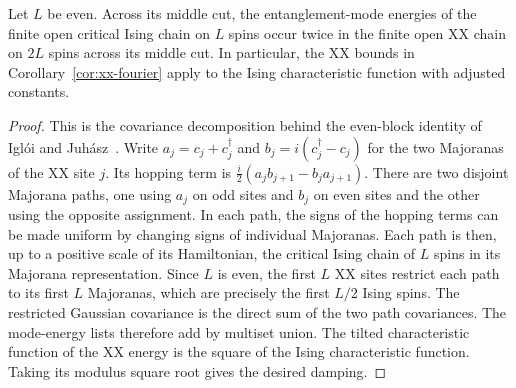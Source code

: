 \begin{corollary}
\label{cor:ising-fourier}
Let $L$ be even. Across its middle cut, the entanglement-mode
energies of the finite open critical Ising chain on $L$ spins
occur twice in the finite open XX chain on $2L$ spins across
its middle cut. In particular, the XX bounds in
Corollary~\ref{cor:xx-fourier} apply to the Ising characteristic
function with adjusted constants.
\end{corollary}

\begin{proof}
This is the covariance decomposition behind the even-block
identity of Igl\'oi and Juh\'asz~\cite[eqs.~(19)--(23)]{IgloiJuhasz08}.
Write $a_j=c_j+c_j^\dagger$ and $b_j=i(c_j^\dagger-c_j)$
for the two Majoranas of the XX site $j$. Its hopping term is
$\tfrac i2(a_j b_{j+1}-b_j a_{j+1})$. There are two disjoint
Majorana paths, one using $a_j$ on odd sites and $b_j$ on even
sites and the other using the opposite assignment. In each path,
the signs of the hopping terms can be made uniform by changing
signs of individual Majoranas. Each path is then, up to a positive
scale of its Hamiltonian, the critical Ising chain of $L$ spins
in its Majorana representation. Since $L$ is even, the first
$L$ XX sites restrict each path to its first $L$ Majoranas, which
are precisely the first $L/2$ Ising spins. The restricted Gaussian
covariance is the direct sum of the two path covariances. The
mode-energy lists therefore add by multiset union. The tilted
characteristic function of the XX energy is the square of the
Ising characteristic function. Taking its modulus square root
gives the desired damping.
\end{proof}
